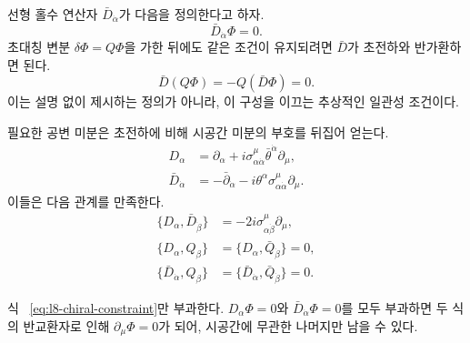 선형 홀수 연산자 \(\bar D_{\dot\alpha}\)가 다음을 정의한다고 하자.
\begin{equation}
\bar D_{\dot\alpha}\Phi=0.
\label{eq:l8-chiral-constraint}
\end{equation}
초대칭 변분 \(\delta\Phi=Q\Phi\)을 가한 뒤에도 같은 조건이 유지되려면 \(\bar D\)가 초전하와 반가환하면 된다.
\begin{equation}
\bar D(Q\Phi)=-Q(\bar D\Phi)=0.
\end{equation}
이는 설명 없이 제시하는 정의가 아니라, 이 구성을 이끄는 추상적인 일관성 조건이다.

\begin{classroomqa}\end{classroomqa}

필요한 공변 미분은 초전하에 비해 시공간 미분의 부호를 뒤집어 얻는다.
\begin{align}
D_\alpha
&=\partial_\alpha
+i\sigma^\mu_{\alpha\dot\alpha}
\bar\theta^{\dot\alpha}\partial_\mu,
\label{eq:l8-D}\\
\bar D_{\dot\alpha}
&=-\bar\partial_{\dot\alpha}
-i\theta^\alpha\sigma^\mu_{\alpha\dot\alpha}\partial_\mu.
\label{eq:l8-Dbar}
\end{align}
이들은 다음 관계를 만족한다.
\begin{align}
\{D_\alpha,\bar D_{\dot\beta}\}
&=-2i\sigma^\mu_{\alpha\dot\beta}\partial_\mu,\\
\{D_\alpha,Q_\beta\}
&=\{D_\alpha,\bar Q_{\dot\beta}\}=0,\\
\{\bar D_{\dot\alpha},Q_\beta\}
&=\{\bar D_{\dot\alpha},\bar Q_{\dot\beta}\}=0.
\end{align}

\begin{classroomqa}\end{classroomqa}

식 ~\eqref{eq:l8-chiral-constraint}만 부과한다. \(D_\alpha\Phi=0\)와 \(\bar D_{\dot\alpha}\Phi=0\)를 모두 부과하면 두 식의 반교환자로 인해 \(\partial_\mu\Phi=0\)가 되어, 시공간에 무관한 나머지만 남을 수 있다.

